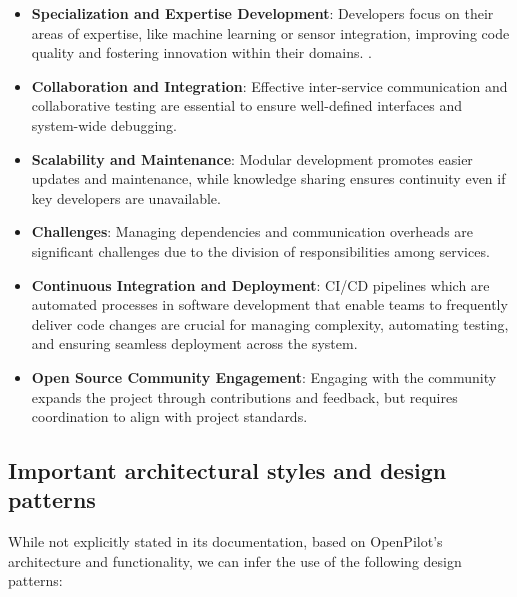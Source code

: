 \documentclass[12pt]{article}
\begin{document}
    \begin{itemize}
        \item[] \textbf{Specialization and Expertise Development}: Developers focus on their areas of expertise, like machine learning or sensor integration, improving code quality and fostering innovation within their domains.
.

        \item[] \textbf{Collaboration and Integration}: Effective inter-service communication and collaborative testing are essential to ensure well-defined interfaces and system-wide debugging.


        \item[] \textbf{Scalability and Maintenance}: Modular development promotes easier updates and maintenance, while knowledge sharing ensures continuity even if key developers are unavailable.

    

        \item[] \textbf{Challenges}: Managing dependencies and communication overheads are significant challenges due to the division of responsibilities among services.


        \item[] \textbf{Continuous Integration and Deployment}: CI/CD pipelines which are automated processes in software development that enable teams to frequently deliver code changes are crucial for managing complexity, automating testing, and ensuring seamless deployment across the system.


        \item[] \textbf{Open Source Community Engagement}: Engaging with the community expands the project through contributions and feedback, but requires coordination to align with project standards.

    \end{itemize}



\subsection{Important architectural styles and design patterns}

While not explicitly stated in its documentation, based on OpenPilot’s architecture and functionality, we can infer the use of the following design patterns:
\end{document}
